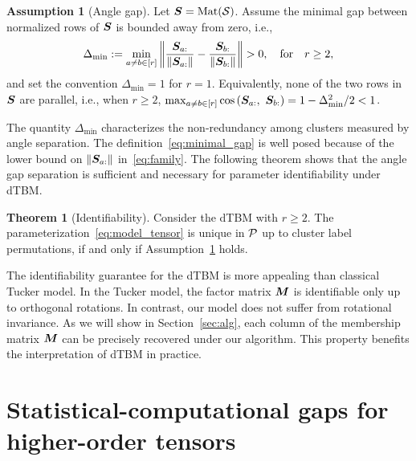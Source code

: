 \documentclass[lettersize,journal]{IEEEtran}
\theoremstyle{definition}
\newtheorem{thm}{Theorem}
\theoremstyle{definition}
\newtheorem{assumption}{Assumption}
\newcommand{\of}[1]{\left(#1\right)}
\begin{document}
\begin{assumption}[Angle gap] \label{assmp:min_gap}Let $\bm S = \text{Mat}(\mathcal{S})$. Assume the minimal gap between normalized rows of $\bm S$ is bounded away from zero, i.e.,
\begin{equation}\label{eq:minimal_gap}
    \Delta_{\min} := \min_{a \neq b \in [r]} \onorm{\frac{\mS_{a:}}{\onormSize{}{ \mS_{a:}}} - \frac{\mS_{b:}}{\onormSize{}{ \mS_{b:}}} }>0, \quad \text{for} \quad r \geq 2,
\end{equation}
and set the convention $\Delta_{\min} = 1$ for $r = 1$.
    Equivalently, none of the two rows in $\bm S$ are parallel, i.e., when $r \geq 2$, $ \max_{a \neq b\in [r]}\cos \of{\mS_{a:},\  \mS_{b:}}  = 1-\Delta^2_{\min}/2<1$.
\end{assumption}
The quantity $\Delta_{\min}$ characterizes the non-redundancy among clusters measured by angle separation. The definition~\eqref{eq:minimal_gap} is well posed because of the lower bound on $\left\lVert\bm S_{a:}\right\rVert$ in~\eqref{eq:family}. The following theorem shows that the angle gap separation is sufficient and necessary for parameter identifiability under dTBM. 

\begin{thm}[Identifiability]\label{thm:unique} Consider the dTBM with $r\geq 2$. The parameterization~\eqref{eq:model_tensor} is unique in $\mathcal{P}$ up to cluster label permutations, if and only if Assumption~\ref{assmp:min_gap} holds.
\end{thm}

The identifiability guarantee for the dTBM is more appealing than classical Tucker model. In the Tucker model, the factor matrix $\bm M$ is identifiable only up to orthogonal rotations. In contrast, our model does not suffer from rotational invariance. As we will show in Section~\ref{sec:alg}, each column of the membership matrix $\bm M$ can be precisely recovered under our algorithm. This property benefits the interpretation of dTBM in practice. 

\section{Statistical-computational gaps for higher-order tensors}\label{sec:limits}
\end{document}
